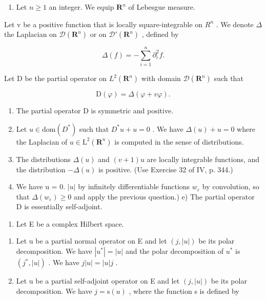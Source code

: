 \begin{enumerate}
\def\labelenumi{\arabic{enumi})}
\setcounter{enumi}{38}
\tightlist
\item
  Let \(n \geqslant 1\) an integer. We equip \(\mathbf{R}^n\) of Lebesgue measure.
\end{enumerate}

Let v be a positive function that is locally square-integrable on \(R^{n}\) . We denote \(\Delta\) the Laplacian on \(\mathcal{D}(\mathbf{R}^{n})\) or on \(\mathcal{D}'(\mathbf{R}^{n})\) , defined by

\[
\Delta (f) = - \sum_ {i = 1} ^ {n} \partial_ {i} ^ {2} f.
\]

Let D be the partial operator on \(L^{2}(\mathbf{R}^{n})\) with domain \(\mathcal{D}(\mathbf{R}^{n})\) such that

\[
\mathrm{D} (\varphi) = \Delta (\varphi + v \varphi).
\]

\begin{enumerate}
\def\labelenumi{\alph{enumi})}
\item
  The partial operator D is symmetric and positive.
\item
  Let \(u \in \text{dom}(D^{*})\) such that \(D^{*}u + u = 0\) . We have \(\Delta(u) + u = 0\) where the Laplacian of \(u \in \text{L}^{2}(\mathbf{R}^{n})\) is computed in the sense of distributions.
\item
  The distributions \(\Delta(u)\) and \((v+1)u\) are locally integrable functions, and the distribution \(-\Delta(u)\) is positive. (Use Exercise 32 of IV, p. 344.)
\item
  We have u = 0. \(|u|\) by infinitely differentiable functions \(w_{\varepsilon}\) by convolution, so that \(\Delta(w_{\varepsilon}) \geqslant 0\) and apply the previous question.) e) The partial operator D is essentially self-adjoint.
\end{enumerate}

\begin{enumerate}
\def\labelenumi{\arabic{enumi})}
\setcounter{enumi}{39}
\tightlist
\item
  Let E be a complex Hilbert space.
\end{enumerate}

\begin{enumerate}
\def\labelenumi{\alph{enumi})}
\item
  Let u be a partial normal operator on E and let \((j, |u|)\) be its polar decomposition. We have \(|u^{*}| = |u|\) and the polar decomposition of \(u^{*}\) is \((j^{*}, |u|)\) . We have \(j|u| = |u|j\) .
\item
  Let u be a partial self-adjoint operator on E and let \((j, |u|)\) be its polar decomposition. We have \(j = \mathrm{s}(u)\) , where the function s is defined by
\end{enumerate}


